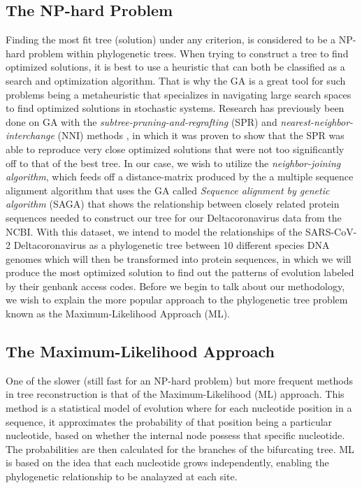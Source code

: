 \subsection{The NP-hard Problem}

Finding the most fit tree (solution) under any criterion, is considered to be a NP-hard problem within phylogenetic trees. When trying to construct a tree to find optimized solutions, it is best to use a heuristic that can both be classified as a search and optimization algorithm. That is why the GA is a great tool for such problems being a metaheuristic that specializes in navigating large search spaces to find optimized solutions in stochastic systems. Research has previously been done on GA with the \emph{subtree-pruning-and-regrafting} (SPR) and \emph{nearest-neighbor-interchange} (NNI) methods \cite{Money}, in which it was proven to show that the SPR was able to reproduce very close optimized solutions that were not too significantly off to that of the best tree. In our case, we wish to utilize the \emph{neighbor-joining algorithm}, which feeds off a distance-matrix produced by the a multiple sequence alignment algorithm that uses the GA called \emph{Sequence alignment by genetic algorithm} (SAGA) that shows the relationship between closely related protein sequences needed to construct our tree for our Deltacoronavirus data from the NCBI. With this dataset, we intend to model the relationships of the SARS-CoV-2 Deltacoronavirus as a phylogenetic tree between 10 different species DNA genomes which will then be transformed into protein sequences, in which we will produce the most optimized solution to find out the patterns of evolution labeled by their genbank access codes. Before we begin to talk about our methodology, we wish to explain the more popular approach to the phylogenetic tree problem known as the Maximum-Likelihood Approach (ML). 

\subsection{The Maximum-Likelihood Approach}

One of the slower (still fast for an NP-hard problem) but more frequent methods in tree reconstruction is that of the Maximum-Likelihood (ML) approach. This method is a statistical model of evolution where for each nucleotide position in a sequence, it approximates the probability of that position being a particular nucleotide, based on whether the internal node possess that specific nucleotide. The probabilities are then calculated for the branches of the bifurcating tree. ML is based on the idea that each nucleotide grows independently, enabling the phylogenetic relationship to be analayzed at each site. 

